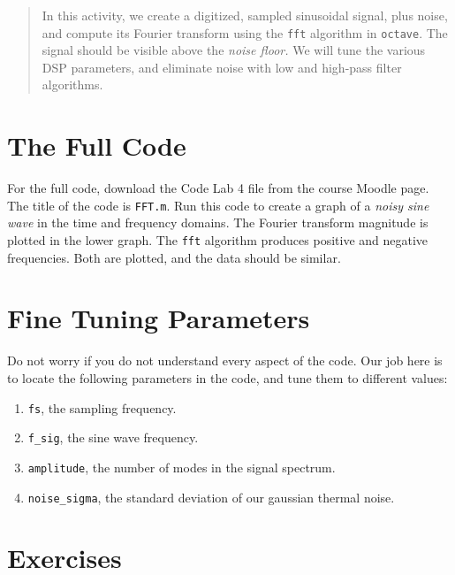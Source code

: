 \documentclass[10.5pt]{article}
\begin{document}
\twocolumn
\maketitle

\begin{abstract}
In this activity, we create a digitized, sampled sinusoidal signal, plus noise, and compute its Fourier transform using the \verb+fft+ algorithm in \verb+octave+.  The signal should be visible above the \textit{noise floor.}  We will tune the various DSP parameters, and eliminate noise with low and high-pass filter algorithms.
\end{abstract}

\section{The Full Code}

For the full code, download the Code Lab 4 file from the course Moodle page.  The title of the code is \verb+FFT.m+.  Run this code to create a graph of a \textit{noisy sine wave} in the time and frequency domains.  The Fourier transform magnitude is plotted in the lower graph.  The \verb+fft+ algorithm produces positive and negative frequencies.  Both are plotted, and the data should be similar.

\section{Fine Tuning Parameters}

Do not worry if you do not understand every aspect of the code.  Our job here is to locate the following parameters in the code, and tune them to different values:

\begin{enumerate}
\item \verb+fs+, the sampling frequency.
\item \verb+f_sig+, the sine wave frequency.
\item \verb+amplitude+, the number of modes in the signal spectrum.
\item \verb+noise_sigma+, the standard deviation of our gaussian thermal noise.
\end{enumerate}

\section{Exercises}
\end{document}
